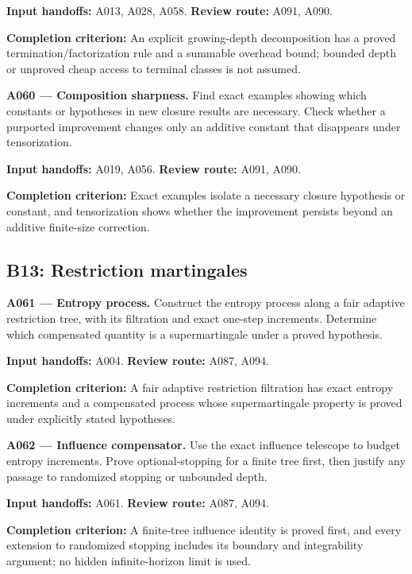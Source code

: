\documentclass[11pt]{article}
\begin{document}
{\small\color{ink}\textbf{Input handoffs:} A013, A028, A058. \textbf{Review route:} A091, A090.\par
\textbf{Completion criterion:} An explicit growing-depth decomposition has a proved termination/factorization rule and a summable overhead bound; bounded depth or unproved cheap access to terminal classes is not assumed.\par}



\textbf{A060 --- Composition sharpness.} Find exact examples showing which constants or hypotheses in new closure results are necessary. Check whether a purported improvement changes only an additive constant that disappears under tensorization.

{\small\color{ink}\textbf{Input handoffs:} A019, A056. \textbf{Review route:} A091, A090.\par
\textbf{Completion criterion:} Exact examples isolate a necessary closure hypothesis or constant, and tensorization shows whether the improvement persists beyond an additive finite-size correction.\par}



\subsection{B13: Restriction martingales}

\textbf{A061 --- Entropy process.} Construct the entropy process along a fair adaptive restriction tree, with its filtration and exact one-step increments. Determine which compensated quantity is a supermartingale under a proved hypothesis.

{\small\color{ink}\textbf{Input handoffs:} A004. \textbf{Review route:} A087, A094.\par
\textbf{Completion criterion:} A fair adaptive restriction filtration has exact entropy increments and a compensated process whose supermartingale property is proved under explicitly stated hypotheses.\par}



\textbf{A062 --- Influence compensator.} Use the exact influence telescope to budget entropy increments. Prove optional-stopping for a finite tree first, then justify any passage to randomized stopping or unbounded depth.

{\small\color{ink}\textbf{Input handoffs:} A061. \textbf{Review route:} A087, A094.\par
\textbf{Completion criterion:} A finite-tree influence identity is proved first, and every extension to randomized stopping includes its boundary and integrability argument; no hidden infinite-horizon limit is used.\par}
\end{document}

